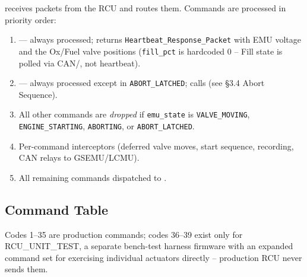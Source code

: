 ﻿\documentclass[11pt,letterpaper]{article}
\begin{document}
 receives packets from the RCU and routes them.
Commands are processed in priority order:

\begin{sloppypar}
\begin{enumerate}[nosep]
  \item {} — always processed; returns
        \texttt{Heartbeat\_Response\_Packet} with EMU voltage and
        the Ox/Fuel valve positions (\texttt{fill\_pct} is hardcoded 0 --
        Fill state is polled via CAN/, not
        heartbeat).
  \item {} — always processed except in \texttt{ABORT\_LATCHED};
        calls  (see §3.4 Abort Sequence).
  \item All other commands are \emph{dropped} if \texttt{emu\_state} is
        \texttt{VALVE\_MOVING}, \texttt{ENGINE\_STARTING},
        \texttt{ABORTING}, or \texttt{ABORT\_LATCHED}.
  \item Per-command interceptors (deferred valve moves, start sequence,
        recording, CAN relays to GSEMU/LCMU).
  \item All remaining commands dispatched to .
\end{enumerate}
\end{sloppypar}

\subsection{Command Table}

\begin{sloppypar}
Codes 1--35 are production commands; codes 36--39 exist only for
RCU\_UNIT\_TEST, a separate bench-test harness firmware with an expanded
command set for exercising individual actuators directly -- production
RCU never sends them.
\end{sloppypar}
\end{document}
